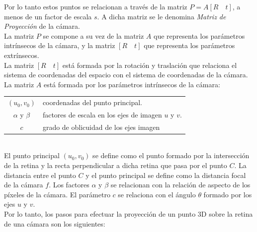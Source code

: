 Por lo tanto estos puntos se relacionan a través de la matriz $P = A [R \quad t]$, a menos de un factor de escala $s$. A dicha matriz  se le denomina \textit{Matriz de Proyección} de la cámara.\\

La matriz $P$ se compone a su vez de la matriz $A$ que representa los parámetros intrínsecos de la cámara, y la matriz $[R \quad t]$ que representa los parámetros extrínsecos.\\

La matriz $[R \quad t]$ está formada por la rotación y traslación que relaciona el sistema de coordenadas del espacio con el sistema de coordenadas de la cámara. La matriz $A$ está formada por los parámetros intrínsecos de la cámara:\\

\begin{tabular}{cp{}}
$(u_0, v_0)$ &  coordenadas del punto principal. \\ 
$\alpha$ y $\beta$ & factores de escala en los ejes de imagen  $u$ y $v$. \\ 
$c$ & grado de oblicuidad de los ejes imagen
\end{tabular} \\

El punto principal $(u_0, v_0)$ se define como el punto formado por la intersección de la retina y la recta perpendicular a dicha retina que pasa por el punto $C$. La distancia entre el punto $C$ y el punto principal se define como la distancia focal de la cámara $f$. Los factores $\alpha$ y $\beta$ se relacionan con la relación de aspecto de los píxeles de la cámara. El parámetro $c$ se relaciona con el ángulo $\theta$ formado por los ejes $u$ y $v$.\\

Por lo tanto, los pasos para efectuar la proyección de un punto 3D sobre la retina de una cámara son los siguientes:

